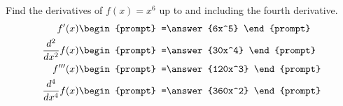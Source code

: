 \documentclass{ximera}
\author{Gregory Hartman \and Matthew Carr}
\begin{document}
\begin{exercise}




Find the derivatives of $f(x)=x^6$ up to and including the fourth derivative.
\begin{align*} 
f'(x)&
\begin{prompt}
=\answer{6x^5}
\end{prompt}\\
\frac{d^2}{dx^2}f(x)&
\begin{prompt} 
=\answer{30x^4}
\end{prompt}\\
f'''(x) &
\begin{prompt} 
=\answer{120x^3}
\end{prompt}\\
\frac{d^4}{dx^4}f(x) &
\begin{prompt} 
=\answer{360x^2}
\end{prompt}
\end{align*}

\end{exercise}
\end{document}
